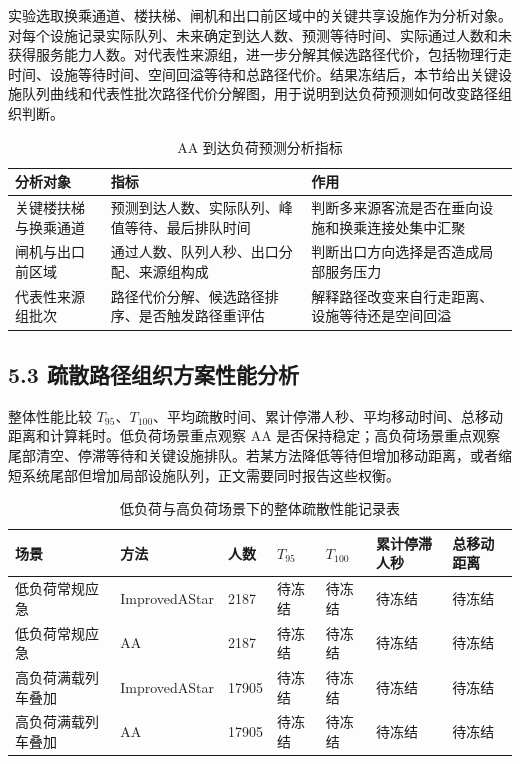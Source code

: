 \documentclass[UTF8,a4paper,12pt]{ctexart}
\begin{document}
实验选取换乘通道、楼扶梯、闸机和出口前区域中的关键共享设施作为分析对象。对每个设施记录实际队列、未来确定到达人数、预测等待时间、实际通过人数和未获得服务能力人数。对代表性来源组，进一步分解其候选路径代价，包括物理行走时间、设施等待时间、空间回溢等待和总路径代价。结果冻结后，本节给出关键设施队列曲线和代表性批次路径代价分解图，用于说明到达负荷预测如何改变路径组织判断。

\begin{table}[htbp]
\centering
\caption{AA 到达负荷预测分析指标}
\small
\begin{tabular}{p{}p{}p{}}
\toprule
分析对象 & 指标 & 作用 \\
\midrule
关键楼扶梯与换乘通道 & 预测到达人数、实际队列、峰值等待、最后排队时间 & 判断多来源客流是否在垂向设施和换乘连接处集中汇聚 \\
闸机与出口前区域 & 通过人数、队列人秒、出口分配、来源组构成 & 判断出口方向选择是否造成局部服务压力 \\
代表性来源组批次 & 路径代价分解、候选路径排序、是否触发路径重评估 & 解释路径改变来自行走距离、设施等待还是空间回溢 \\
\bottomrule
\end{tabular}
\end{table}

\subsection{5.3 疏散路径组织方案性能分析}

整体性能比较 \(T_{95}\)、\(T_{100}\)、平均疏散时间、累计停滞人秒、平均移动时间、总移动距离和计算耗时。低负荷场景重点观察 AA 是否保持稳定；高负荷场景重点观察尾部清空、停滞等待和关键设施排队。若某方法降低等待但增加移动距离，或者缩短系统尾部但增加局部设施队列，正文需要同时报告这些权衡。

\begin{table}[htbp]
\centering
\caption{低负荷与高负荷场景下的整体疏散性能记录表}
\small
\begin{tabular}{p{}p{}p{}p{}p{}p{}p{}}
\toprule
场景 & 方法 & 人数 & \(T_{95}\) & \(T_{100}\) & 累计停滞人秒 & 总移动距离 \\
\midrule
低负荷常规应急 & ImprovedAStar & 2187 & 待冻结 & 待冻结 & 待冻结 & 待冻结 \\
低负荷常规应急 & AA & 2187 & 待冻结 & 待冻结 & 待冻结 & 待冻结 \\
高负荷满载列车叠加 & ImprovedAStar & 17905 & 待冻结 & 待冻结 & 待冻结 & 待冻结 \\
高负荷满载列车叠加 & AA & 17905 & 待冻结 & 待冻结 & 待冻结 & 待冻结 \\
\bottomrule
\end{tabular}
\end{table}
\end{document}
